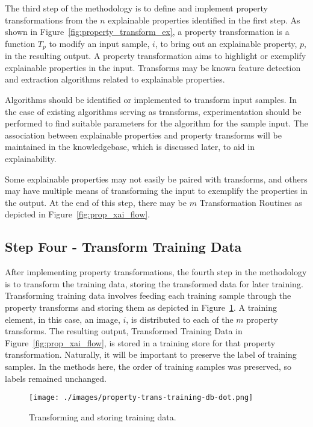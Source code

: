 The third step of the methodology is to define and implement property
transformations from the $n$ explainable properties identified in the first
step. As shown in Figure~\ref{fig:property_transform_ex}, a property
transformation is a function $T_p$ to modify an input sample, $i$, to bring out
an explainable property, $p$, in the resulting output. A property transformation
aims to highlight or exemplify explainable properties in the input. Transforms
may be known feature detection and extraction algorithms related to explainable
properties.

Algorithms should be identified or implemented to transform input samples. In
the case of existing algorithms serving as transforms, experimentation should be
performed to find suitable parameters for the algorithm for the sample input.
The association between explainable properties and property transforms will be
maintained in the knowledgebase, which is discussed later, to aid in
explainability. 

Some explainable properties may not easily be paired with transforms, and others
may have multiple means of transforming the input to exemplify the properties in
the output. At the end of this step, there may be $m$ Transformation Routines as
depicted in Figure~\ref{fig:prop_xai_flow}.

\subsection{Step Four - Transform Training Data} %

After implementing property transformations, the fourth step in the methodology
is to transform the training data, storing the transformed data for later
training. Transforming training data involves feeding each training sample
through the property transforms and storing them as depicted in
Figure~\ref{fig:property_trans_training}. A training element, in this case, an
image, $i$, is distributed to each of the $m$ property transforms. The resulting
output, Transformed Training Data in Figure~\ref{fig:prop_xai_flow}, is stored
in a training store for that property transformation. Naturally, it will be
important to preserve the label of training samples. In the methods here, the
order of training samples was preserved, so labels remained unchanged.

\begin{figure}[h]
    \centering
    \texttt{[image: ./images/property-trans-training-db-dot.png]}
    \caption{Transforming and storing training data.}
    \label{fig:property_trans_training}
\end{figure}

